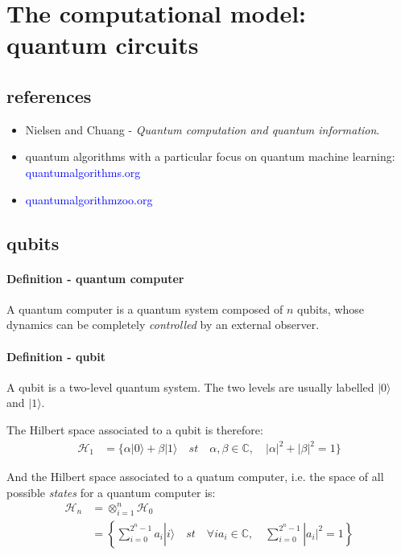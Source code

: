 \documentclass{article}
\begin{document}
\tableofcontents
\section{The computational model: quantum circuits}

\subsection{references}

\begin{itemize}
    \item Nielsen and Chuang - \emph{Quantum computation and quantum information}.
    \item quantum algorithms with a particular focus on quantum machine learning: \textcolor{blue}{quantumalgorithms.org}
    \item \textcolor{blue}{quantumalgorithmzoo.org}
\end{itemize}

\subsection{qubits}

\paragraph{Definition - quantum computer} A quantum computer is a quantum system composed of $n$ qubits,
whose dynamics can be completely \emph{controlled} by an external observer. 

\paragraph{Definition - qubit} A qubit is a two-level quantum system. The two levels are usually labelled
$|0\rangle$ and $|1\rangle$.

The Hilbert space associated to a qubit is therefore: 
\begin{align*}
\mathcal{H}_1 &= \{\alpha |0\rangle + \beta |1\rangle\quad st \quad\alpha,\beta\in\mathbb{C},\quad|\alpha|^{2}+|\beta|^2=1\}
\end{align*}

And the Hilbert space associated to a quatum computer, i.e. the space of all possible \emph{states} for a quantum computer is: 
\begin{align*}
\mathcal{H}_n &=  \otimes_{i=1}^{n} \mathcal{H}_0 \\
              &=  \left\{\sum_{i=0}^{2^n - 1} a_i |i\rangle\quad st\quad\forall i a_i \in \mathbb{C},\quad\sum_{i=0}^{2^n - 1} |a_i|^2 = 1 \right\} 
\end{align*}
\end{document}
